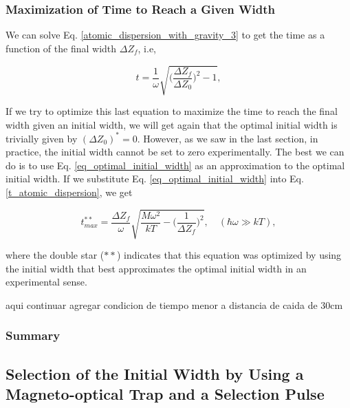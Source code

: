 \documentclass{article}
\begin{document}

\subsubsection{Maximization of Time to Reach a Given Width}
We can solve Eq. \ref{atomic_dispersion_with_gravity_3} to get the time as a function of the final width $\Delta Z_{f}$, i.e,

\begin{equation}\label{t_atomic_dispersion}
    t = \frac{1}{\omega} \sqrt{\bigg( \frac{\Delta Z_{f}}{\Delta Z_{0}} \bigg)^{2} - 1},
\end{equation}

If we try to optimize this last equation to maximize the time to reach the final width given an initial width, we will get again that the optimal initial width is trivially given by $(\Delta Z_{0})^{*} = 0$. However, as we saw in the last section, in practice, the initial width cannot be set to zero experimentally. The best we can do is to use Eq. \ref{eq_optimal_initial_width} as an approximation to the optimal initial width. If we substitute Eq. \ref{eq_optimal_initial_width} into Eq. \ref{t_atomic_dispersion}, we get

\begin{equation}\label{t_dipole_trap_optimized}
    t^{**}_{max} = \frac{\Delta Z_{f}}{\omega} \sqrt{\frac{M \omega^{2}}{kT} - \bigg(\frac{1}{\Delta Z_{f}}\bigg)^{2}}, \quad (\hbar \omega \gg kT),
\end{equation}

where the double star ($**$) indicates that this equation was optimized by using the initial width that best approximates the optimal initial width in an experimental sense.

aqui continuar agregar condicion de tiempo menor a distancia de caida de 30cm

\subsubsection{Summary}

\subsection{Selection of the Initial Width by Using a Magneto-optical Trap and a Selection Pulse}
\end{document}
